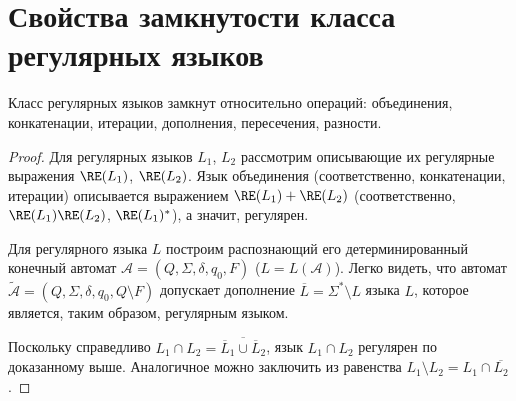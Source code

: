 \section{Свойства замкнутости класса регулярных языков}
\begin{Thm}Класс регулярных языков замкнут относительно операций: объединения,
конкатенации, итерации, дополнения, пересечения, разности.
\end{Thm}
\begin{proof}Для регулярных языков $L_1$, $L_2$ рассмотрим описывающие
их регулярные выражения $\RE(L_1)$, $\RE(L_2)$. Язык объединения
(соответственно, конкатенации, итерации) описывается выражением $\RE(L_1) +
\RE(L_2)$ (соответственно, $\RE(L_1)\RE(L_2)$, $\RE(L_1)^\ast$), а значит,
регулярен.

Для регулярного языка $L$ построим распознающий его детерминированный конечный
автомат $\mathcal A = (Q, \Sigma, \delta, q_0, F)$ ($L=L(\mathcal A)$). Легко
видеть, что автомат $\widetilde{\mathcal A} = (Q, \Sigma, \delta, q_0, Q
\setminus F)$ допускает дополнение $\overline L = \Sigma^\ast \setminus L$ языка
$L$, которое является, таким образом, регулярным языком.

Поскольку справедливо $L_1 \cap L_2 = \overline{\overline L_1 \cup \overline
L_2}$, язык $L_1 \cap L_2$ регулярен по доказанному выше. Аналогичное можно 
заключить из равенства $L_1 \setminus L_2 = L_1 \cap \overline{L_2}$.
\end{proof}

